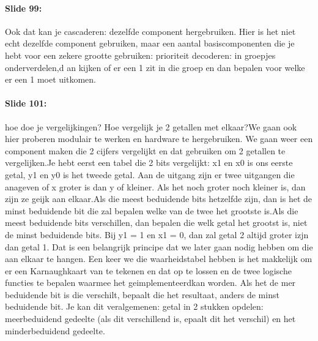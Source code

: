 \documentclass[10pt,a4paper]{book}
\begin{document}
\paragraph{Slide 99:} Ook dat kan je cascaderen: dezelfde component hergebruiken. Hier is het niet echt dezelfde component gebruiken, maar een aantal basiscomponenten die je hebt voor een zekere grootte gebruiken: prioriteit decoderen: in groepjes onderverdelen,d an kijken of er een 1 zit in die groep en dan bepalen voor welke er een 1 moet uitkomen. 

\paragraph{Slide 101:} hoe doe je vergelijkingen? Hoe vergelijk je 2 getallen met elkaar?We gaan ook hier proberen modulair te werken en hardware te hergebruiken. We gaan weer een component maken die 2 cijfers vergelijkt en dat gebruiken om 2 getallen te vergelijken.Je hebt eerst een tabel die 2 bits vergelijkt: x1 en x0 is ons eerste getal, y1 en y0 is het tweede getal. Aan de uitgang zijn er twee uitgangen die anageven of x groter is dan y of kleiner. Als het noch groter noch kleiner is, dan zijn ze geijk aan elkaar.Als die meest beduidende bits hetzelfde zijn, dan is het de minst beduidende bit die zal bepalen welke van de twee het grootste is.Als die meest beduidende bits verschillen, dan bepalen die welk getal het grootst is, niet de minst beduidende bits. Bij y1 = 1 en x1 = 0, dan zal getal 2 altijd groter izjn dan getal 1. Dat is een belangrijk principe dat we later gaan nodig hebben om die aan elkaar te hangen. Een keer we die waarheidstabel hebben is het makkelijk om er een Karnaughkaart van te tekenen en dat op te lossen en de twee logische functies te bepalen waarmee het geimplementeerdkan worden. Als het de mer beduidende bit is die verschilt, bepaalt die het resultaat, anders de minst beduidende bit. Je kan dit veralgemenen: getal in 2 stukken opdelen: meerbeduidend gedeelte (als dit verschillend is, epaalt dit het verschil) en het minderbeduidend gedeelte.
\end{document}
